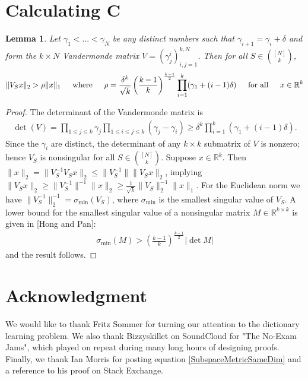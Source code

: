 \documentclass[journal, onecolumn]{IEEEtran}
\newtheorem{lemma}{Lemma}
\begin{document}

\section{Calculating C}


\begin{lemma}\label{MatrixLowerBoundLemma}
Let $\gamma_1 < ... < \gamma_N$ be any distinct numbers such that $\gamma_{i+1} = \gamma_i + \delta$ and form the $k \times N$ Vandermonde matrix $V = (\gamma^i_j)^{k,N}_{i,j=1}$. Then for all $S \in {[N] \choose k}$, 
\begin{align}
	\|V_S x\|_2 > \rho \|x\|_1 \indent \text{where} \indent \rho = \frac{\delta^k}{\sqrt{k}} \left( \frac{k-1}{k} \right)^\frac{k-1}{2} \prod_{i = 1}^k (\gamma_1 + (i-1)\delta) \indent \text{for all} \indent x \in \mathbb{R}^k
\end{align}
\end{lemma}

\begin{proof} 
The determinant of the Vandermonde matrix is
\begin{align}
	\det(V) = \prod_{1 \leq j \leq k} \gamma_j \prod_{1 \leq i \leq j \leq k} (\gamma_j - \gamma_i) \geq \delta^k \prod_{i = 1}^k (\gamma_1 + (i-1)\delta).
\end{align}	
Since the $\gamma_i$ are distinct, the determinant of any $k \times k$ submatrix of $V$ is nonzero; hence $V_S$ is nonsingular for all $S \in {[N] \choose k}$. Suppose $x \in \mathbb{R}^k$. Then $\|x\|_2 = \|V_S^{-1} V_S x\|_2 \leq \|V_S^{-1}\| \|V_S x\|_2$, implying $\|V_Sx\|_2 \geq \|V_S^{-1}\|^{-1}\|x\|_2 \geq \frac{1}{\sqrt{k}} \|V_S\|_2^{-1}\|x\|_1$. For the Euclidean norm we have $\|V_S^{-1}\|_2^{-1} = \sigma_{\min}(V_S)$, where $\sigma_{\min}$ is the smallest singular value of $V_S$. A lower bound for the smallest singular value of a nonsingular matrix $M \in \mathbb{R}^{k \times k}$ is given in [Hong and Pan]:
\begin{align}
	\sigma_{\min}(M) > \left( \frac{k-1}{k} \right)^\frac{k-1}{2} |\det M|
\end{align}
%
and the result follows. 
\end{proof}


\section*{Acknowledgment}
We would like to thank Fritz Sommer for turning our attention to the dictionary learning problem. We also thank Bizzyskillet on SoundCloud for "The No-Exam Jams", which played on repeat during many long hours of designing proofs. Finally, we thank Ian Morris for posting equation \eqref{SubspaceMetricSameDim} and a reference to his proof on Stack Exchange. 
\end{document}

